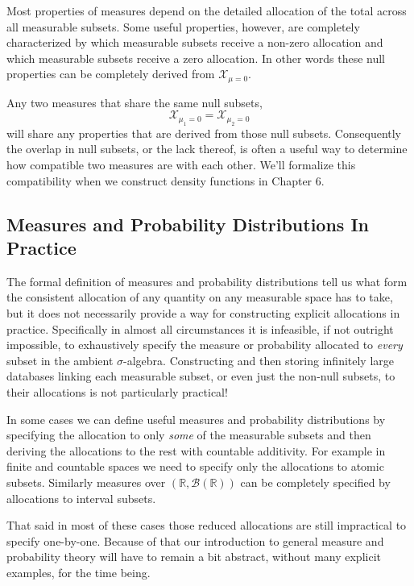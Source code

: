 \documentclass[
  letterpaper,
  DIV=11,
  numbers=noendperiod]{scrartcl}
\begin{document}
Most properties of measures depend on the detailed allocation of the
total across all measurable subsets. Some useful properties, however,
are completely characterized by which measurable subsets receive a
non-zero allocation and which measurable subsets receive a zero
allocation. In other words these null properties can be completely
derived from \(\mathcal{X}_{\mu = 0}\).

Any two measures that share the same null subsets, \[
\mathcal{X}_{\mu_{1} = 0} = \mathcal{X}_{\mu_{2} = 0}
\] will share any properties that are derived from those null subsets.
Consequently the overlap in null subsets, or the lack thereof, is often
a useful way to determine how compatible two measures are with each
other. We'll formalize this compatibility when we construct density
functions in Chapter 6.

\hypertarget{measures-and-probability-distributions-in-practice}{%
\subsection{Measures and Probability Distributions In
Practice}\label{measures-and-probability-distributions-in-practice}}

The formal definition of measures and probability distributions tell us
what form the consistent allocation of any quantity on any measurable
space has to take, but it does not necessarily provide a way for
constructing explicit allocations in practice. Specifically in almost
all circumstances it is infeasible, if not outright impossible, to
exhaustively specify the measure or probability allocated to
\emph{every} subset in the ambient \(\sigma\)-algebra. Constructing and
then storing infinitely large databases linking each measurable subset,
or even just the non-null subsets, to their allocations is not
particularly practical!

In some cases we can define useful measures and probability
distributions by specifying the allocation to only \emph{some} of the
measurable subsets and then deriving the allocations to the rest with
countable additivity. For example in finite and countable spaces we need
to specify only the allocations to atomic subsets. Similarly measures
over \((\mathbb{R}, \mathcal{B}(\mathbb{R}))\) can be completely
specified by allocations to interval subsets.

That said in most of these cases those reduced allocations are still
impractical to specify one-by-one. Because of that our introduction to
general measure and probability theory will have to remain a bit
abstract, without many explicit examples, for the time being.
\end{document}
